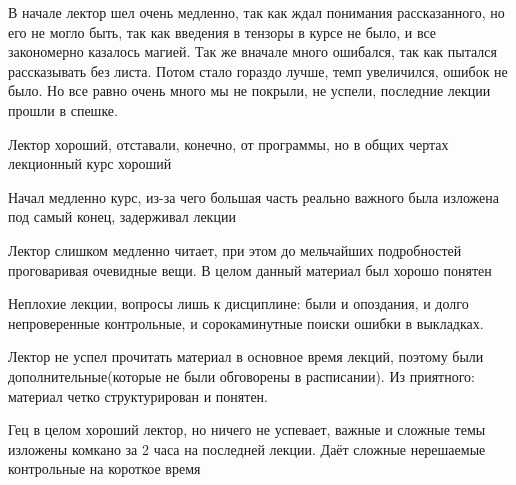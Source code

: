             \begin{commentbox} 
                В начале лектор шел очень медленно, так как ждал понимания рассказанного, но его не могло быть, так как введения в тензоры в курсе не было, и все закономерно казалось магией. Так же вначале много ошибался, так как пытался рассказывать без листа. Потом стало гораздо лучше, темп увеличился, ошибок не было. Но все равно очень много мы не покрыли, не успели, последние лекции прошли в спешке.  
            \end{commentbox} 
        
            \begin{commentbox} 
                Лектор хороший, отставали, конечно, от программы, но в общих чертах лекционный курс хороший  
            \end{commentbox} 
        
            \begin{commentbox} 
                Начал медленно курс, из-за чего большая часть реально важного была изложена под самый конец, задерживал лекции 
            \end{commentbox} 
        
            \begin{commentbox} 
                Лектор слишком медленно читает, при этом до мельчайших подробностей проговаривая очевидные вещи. В целом данный материал был хорошо понятен 
            \end{commentbox} 
        
            \begin{commentbox} 
                Неплохие лекции, вопросы лишь к дисциплине: были и опоздания, и долго непроверенные контрольные, и сорокаминутные поиски ошибки в выкладках. 
            \end{commentbox} 
        
            \begin{commentbox} 
                Лектор не успел прочитать материал в основное время лекций, поэтому были дополнительные(которые не были обговорены в расписании). Из приятного: материал четко структурирован и понятен. 
            \end{commentbox} 
        
            \begin{commentbox} 
                Гец в целом хороший лектор, но ничего не успевает, важные и сложные темы изложены комкано за 2 часа на последней лекции. Даёт сложные нерешаемые контрольные на короткое время 
            \end{commentbox} 
        
